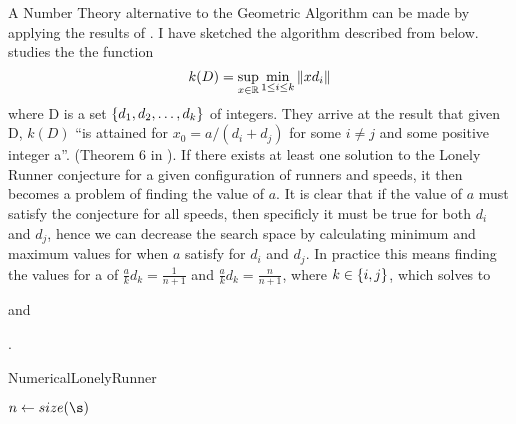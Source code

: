A Number Theory alternative to the Geometric Algorithm can be made by applying the results of \cite{invis}. I have sketched the algorithm described from \cite{invis} below. \cite{invis} studies the the function 
$$
k(D) = \sup_{x \in \mathbb{R}}\min_{1 \leq i \leq k}\Vert x d_i \Vert
$$
where D is a set $\{d_1, d_2, \ldots, d_k\}$ of integers. They arrive at the result that given D, $k(D)$ ``is attained for $x_0 = a /(d_i + d_j)$ for some $i \neq j$ and some positive integer a''. (Theorem 6 in \cite{invis}). If there exists at least one solution to the Lonely Runner conjecture for a given configuration of runners and speeds, it then becomes a problem of finding the value of $a$. It is clear that if the value of $a$ must satisfy the conjecture for all speeds, then specificly it must be true for both $d_i$ and $d_j$, hence we can decrease the search space by calculating minimum and maximum values for when $a$ satisfy for $d_i$ and $d_j$. In practice this means finding the values for a of $\frac{a}{k}d_k = \frac{1}{n+1}$ and $\frac{a}{k}d_k = \frac{n}{n+1}$, where $k \in \{i, j\}$, which solves to 


and



 .

\begin{algorithm}[H]
  \caption{NumericalLonelyRunner}
  \highlights
  
  $n \gets size(\s)$

  \return \no
\end{algorithm}

